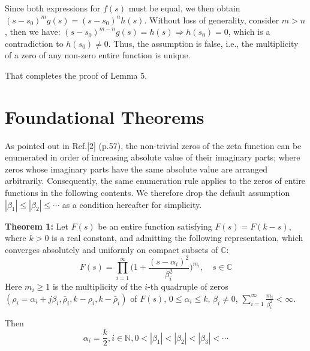 \documentclass[12pt]{article}
\begin{document}
Since both expressions for $f(s)$ must be equal, we then obtain $ (s - s_0)^m g(s) = (s - s_0)^n h(s) $.
Without loss of generality, consider $ m > n $, then we have:
$ (s - s_0)^{m-n} g(s) = h(s) \Rightarrow h(s_0) = 0$, which is a contradiction to $h(s_0) \neq 0$.
Thus, the assumption is false, i.e., the multiplicity of a zero of any non-zero entire function is unique.

That completes the proof of Lemma 5.


\section{Foundational Theorems}
As pointed out in Ref.[2] (p.57), the non-trivial zeros of the zeta function can be enumerated in order of increasing absolute value of their imaginary parts; where zeros
whose imaginary parts have the same absolute value are arranged arbitrarily. Consequently, the same enumeration rule applies to the zeros of entire functions in the following contents.  We therefore drop the default assumption $|\beta_1|\leq|\beta_2|\leq \cdots$ as a condition hereafter for simplicity.

\textbf{Theorem 1:}
Let $F(s)$ be an entire function satisfying $F(s)=F(k-s)$, where $k >0 $ is a real constant, and admitting the following representation, which converges absolutely and uniformly on compact subsets of $\mathbb C$:
\begin{equation}
F(s)=\prod_{i=1}^{\infty}\bigl(1+\frac{(s-\alpha_i)^2}{\beta_i^2}\bigr)^{m_i},
\quad s\in\mathbb{C}
\end{equation}
Here
$m_i \geq 1$ is the multiplicity of the $i$-th quadruple of zeros $(\rho_i=\alpha_i + j\beta_i, \bar\rho_i, k-\rho_i, k-\bar\rho_i)$ of $F(s)$, $0\leq \alpha_i \leq k$, $\beta_i \neq 0$,
 $\displaystyle\sum_{i=1}^{\infty}\frac{m_i}{\beta_i^2}<\infty$.

Then
\begin{equation}
\alpha_i=\frac{k}{2}, i\in\mathbb{N}, 0<|\beta_1|<|\beta_2|<|\beta_3|<\cdots
\end{equation}
\end{document}

